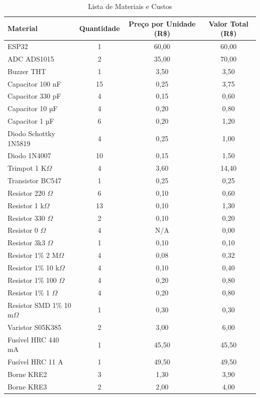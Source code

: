 \begin{table}[h!]
\centering
\caption{Lista de Materiais e Custos}
\vspace*{5mm}
\label{tab:Bookofmaterials}
\begin{tabular}{ l c c c }
\hline
\textbf{Material} & \textbf{Quantidade} & \textbf{Preço por Unidade (R\$)} & \textbf{Valor Total (R\$)} \\ \hline
ESP32 & 1 & 60,00 & 60,00 \\ \hline
ADC ADS1015 & 2 & 35,00 & 70,00 \\ \hline
Buzzer THT & 1 & 3,50 & 3,50 \\ \hline
Capacitor 100 nF & 15 & 0,25 & 3,75 \\ \hline
Capacitor 330 pF & 4 & 0,15 & 0,60 \\ \hline
Capacitor 10 µF & 4 & 0,20 & 0,80 \\ \hline
Capacitor 1 µF & 6 & 0,20 & 1,20 \\ \hline
Diodo Schottky 1N5819 & 4 & 0,25 & 1,00 \\ \hline
Diodo 1N4007 & 10 & 0,15 & 1,50 \\ \hline
Trimpot 1 K$\Omega$ & 4 & 3,60 & 14,40 \\ \hline
Transistor BC547 & 1 & 0,25 & 0,25 \\ \hline
Resistor 220 $\Omega$ & 6 & 0,10 & 0,60 \\ \hline
Resistor 1 k$\Omega$ & 13 & 0,10 & 1,30 \\ \hline
Resistor 330 $\Omega$ & 2 & 0,10 & 0,20 \\ \hline
Resistor 0 $\Omega$ & 4 & N/A & 0,00 \\ \hline
Resistor 3k3 $\Omega$ & 1 & 0,10 & 0,10 \\ \hline
Resistor 1\% 2 M$\Omega$ & 4 & 0,08 & 0,32 \\ \hline
Resistor 1\% 10 k$\Omega$ & 4 & 0,10 & 0,40 \\ \hline
Resistor 1\% 100 $\Omega$ & 4 & 0,20 & 0,80 \\ \hline
Resistor 1\% 1 $\Omega$ & 4 & 0,20 & 0,80 \\ \hline
Resistor SMD 1\% 10 m$\Omega$ & 1 & 0,30 & 0,30 \\ \hline
Varistor S05K385 & 2 & 3,00 & 6,00 \\ \hline
Fusível HRC 440 mA & 1 & 45,50 & 45,50 \\ \hline
Fusível HRC 11 A & 1 & 49,50 & 49,50 \\ \hline
Borne KRE2 & 3 & 1,30 & 3,90 \\ \hline
Borne KRE3 & 2 & 2,00 & 4,00 \\ \hline

\end{tabular}
\end{table}
